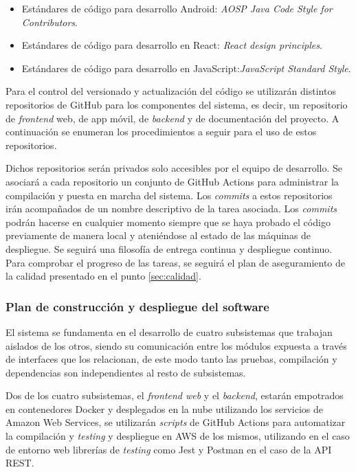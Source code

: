 \documentclass{article}
\begin{document}
\begin{itemize}
    \setlength{\itemsep}{0em}
    \item Estándares de código para desarrollo Android: \textit{AOSP Java Code Style for Contributors}.
    \item Estándares de código para desarrollo en React: \textit{React design principles}.
    \item Estándares de código para desarrollo en JavaScript:\textit{JavaScript Standard Style}.
\end{itemize}

Para el control del versionado y actualización del código se utilizarán distintos repositorios de GitHub para los componentes del sistema, es decir, un repositorio de \textit{frontend} web, de app móvil, de \textit{backend} y de documentación del proyecto. A continuación se enumeran los procedimientos a seguir para el uso de estos repositorios.

Dichos repositorios serán privados solo accesibles por el equipo de desarrollo. Se asociará a cada repositorio un conjunto de GitHub Actions para administrar la compilación y puesta en marcha del sistema. Los \textit{commits} a estos repositorios irán acompañados de un nombre descriptivo de la tarea asociada. Los \textit{commits} podrán hacerse en cualquier momento siempre que se haya probado el código previamente de manera local y ateniéndose al estado de las máquinas de despliegue. Se seguirá una filosofía de entrega continua y despliegue continuo. Para comprobar el progreso de las tareas, se seguirá el plan de aseguramiento de la calidad presentado en el punto \ref{sec:calidad}.

\subsubsection{Plan de construcción y despliegue del software}
El sistema se fundamenta en el desarrollo de cuatro subsistemas que trabajan aislados de los otros, siendo su comunicación entre los módulos expuesta a través de interfaces que los relacionan, de este modo tanto las pruebas, compilación y dependencias son independientes al resto de subsistemas. 
 
Dos de los cuatro subsistemas, el \textit{frontend web} y el \textit{backend}, estarán empotrados en contenedores Docker y desplegados en la nube utilizando los servicios de Amazon Web Services, se utilizarán \textit{scripts} de GitHub Actions para automatizar la compilación y \textit{testing} y despliegue en AWS de los mismos, utilizando en el caso de entorno web librerías de \textit{testing} como Jest y Postman en el caso de la API REST. 
\end{document}
